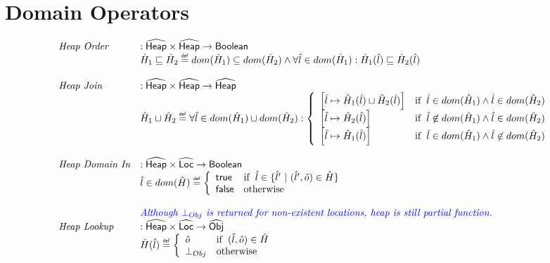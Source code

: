 \section{Domain Operators}
\[
\begin{array}{ll}
\textit{Heap Order} & : \widehat{\mbox{\textsf{Heap}}} \times \widehat{\mbox{\textsf{Heap}}} \rightarrow \mbox{\textsf{Boolean}} \\
& \hat{H}_1 \sqsubseteq \hat{H}_2 \stackrel{\tiny \mbox{\textsf{def}}}{=} dom(\hat{H}_1) \subseteq dom(\hat{H}_2) 
	\land \forall \hat{l} \in dom(\hat{H}_1): \hat{H}_1(\hat{l}) \sqsubseteq \hat{H}_2(\hat{l})\\
\\

\textit{Heap Join} & : \widehat{\mbox{\textsf{Heap}}} \times \widehat{\mbox{\textsf{Heap}}} \rightarrow \widehat{\mbox{\textsf{Heap}}} \\
& \hat{H}_1 \sqcup \hat{H}_2  \stackrel{\tiny \mbox{\textsf{def}}}{=} \forall \hat{l} \in dom(\hat{H}_1) \cup dom(\hat{H}_2): 
  \left\{
    \begin{array}{ll}
      \left[\hat{l} \mapsto \hat{H}_1(\hat{l}) \sqcup \hat{H}_2(\hat{l})\right] & {\rm if}\begin{array}[t]{l}\hat{l} \in dom(\hat{H}_1)\land \hat{l} \in dom(\hat{H}_2)\end{array}\\
      \left[\hat{l} \mapsto \hat{H}_2(\hat{l}) \right] & {\rm if}\begin{array}[t]{l}\hat{l} \not\in dom(\hat{H}_1)\land \hat{l} \in dom(\hat{H}_2)\end{array}\\
      \left[\hat{l} \mapsto \hat{H}_1(\hat{l}) \right] & {\rm if}\begin{array}[t]{l}\hat{l} \in dom(\hat{H}_1)\land \hat{l} \not\in dom(\hat{H}_2)\end{array}\\
    \end{array}
  \right.\\
\\

\textit{Heap Domain In} & : \widehat{\mbox{\textsf{Heap}}} \times \widehat{\mbox{\textsf{Loc}}} \rightarrow \mbox{\textsf{Boolean}} \\
& \hat{l} \in dom(\hat{H}) \stackrel{\tiny \mbox{\textsf{def}}}{=}
 \left\{
   \begin{array}{ll}
     \mbox{\textsf{true}}
     & {\rm if}\begin{array}[t]{l}\hat{l} \in \{ \hat{l}'\ |\ (\hat{l}', \hat{o}) \in \hat{H}\}\end{array} \\
     \mbox{\textsf{false}}
     & {\rm otherwise} \\
   \end{array}
 \right.\\
\\

& {\color{blue} \textit{Although $\bot_{Obj}$ is returned for non-existent locations, heap is still partial function.}} \\
\textit{Heap Lookup} & : \widehat{\mbox{\textsf{Heap}}} \times \widehat{\mbox{\textsf{Loc}}} \rightarrow \widehat{\mbox{\textsf{Obj}}} \\
& \hat{H}(\hat{l}) \stackrel{\tiny \mbox{\textsf{def}}}{=}
 \left\{
   \begin{array}{ll}
      \hat{o} & {\rm if}\begin{array}[t]{l}(\hat{l}, \hat{o}) \in \hat{H}\end{array} \\
      \bot_{Obj} & {\rm otherwise}
   \end{array}
 \right.\\
\\


\end{array}\]
